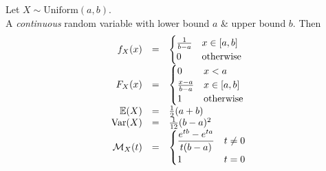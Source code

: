 \documentclass[11pt,a4paper]{article}
\begin{document}
Let $X\sim\text{Uniform}(a,b)$.\\
A \textit{continuous} random variable with lower bound $a$ \& upper bound $b$. Then
\[\begin{array}{rcll}
f_X(x)&=&\begin{cases}\frac{1}{b-a}&x\in[a,b]\\0&\text{otherwise}\end{cases}\\
F_X(x)&=&\begin{cases}0&x<a\\\frac{x-a}{b-a}&x\in[a,b]\\1&\text{otherwise}\end{cases}\\
\mathbb{E}(X)&=&\frac{1}{2}(a+b)\\
\mathrm{Var}(X)&=&\frac{1}{12}(b-a)^2\\
\mathcal{M}_X(t)&=&\begin{cases}\dfrac{e^{tb}-e^{ta}}{t(b-a)}&t\neq0\\1&t=0\end{cases}
\end{array}\]
\end{document}
